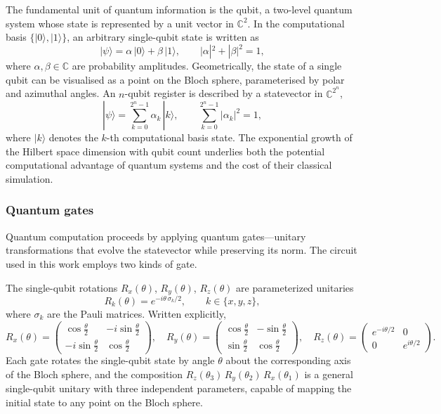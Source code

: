 The fundamental unit of quantum information is the qubit, a
two-level quantum system whose state is represented by a unit vector in
$\mathbb{C}^2$.  In the computational basis $\{|0\rangle, |1\rangle\}$,
an arbitrary single-qubit state is written as
\begin{equation}
  |\psi\rangle = \alpha\,|0\rangle + \beta\,|1\rangle, \qquad
  |\alpha|^2 + |\beta|^2 = 1,
\end{equation}
where $\alpha, \beta \in \mathbb{C}$ are probability amplitudes.
Geometrically, the state of a single qubit can be visualised as a point
on the Bloch sphere, parameterised by polar and azimuthal angles.  An
$n$-qubit register is described by a statevector in
$\mathbb{C}^{2^n}$,
\begin{equation}
  |\psi\rangle = \sum_{k=0}^{2^n - 1} \alpha_k\,|k\rangle, \qquad
  \sum_{k=0}^{2^n - 1} |\alpha_k|^2 = 1,
\end{equation}
where $|k\rangle$ denotes the $k$-th computational basis state.  The
exponential growth of the Hilbert space dimension with qubit count
underlies both the potential computational advantage of quantum systems
and the cost of their classical simulation.

\subsubsection{Quantum gates}

Quantum computation proceeds by applying quantum gates---unitary transformations that evolve the statevector while preserving its norm. The circuit used in this work employs two kinds of gate.

The single-qubit rotations $R_x(\theta)$, $R_y(\theta)$, $R_z(\theta)$ are parameterized unitaries
\begin{equation}
  R_k(\theta) = e^{-i\theta\,\sigma_k/2}, \qquad k \in \{x,y,z\},
\end{equation}
where $\sigma_k$ are the Pauli matrices. Written explicitly,
\begin{equation}
  R_x(\theta) =
  \begin{pmatrix} \cos\tfrac{\theta}{2} & -i\sin\tfrac{\theta}{2} \\
  -i\sin\tfrac{\theta}{2} & \cos\tfrac{\theta}{2} \end{pmatrix},
\quad
  R_y(\theta) =
  \begin{pmatrix} \cos\tfrac{\theta}{2} & -\sin\tfrac{\theta}{2} \\
  \sin\tfrac{\theta}{2} & \cos\tfrac{\theta}{2} \end{pmatrix},
\quad
  R_z(\theta) =
  \begin{pmatrix} e^{-i\theta/2} & 0 \\
  0 & e^{i\theta/2} \end{pmatrix}.
\end{equation}
Each gate rotates the single-qubit state by angle $\theta$ about the corresponding axis of the Bloch sphere, and the composition $R_z(\theta_3)\,R_y(\theta_2)\,R_x(\theta_1)$ is a general single-qubit unitary with three independent parameters, capable of mapping the initial state to any point on the Bloch sphere.

